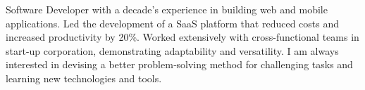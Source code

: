 
\begin{cvparagraph}

Software Developer with a decade's experience in building web and mobile applications. Led the development of a SaaS platform that reduced costs and increased productivity by 20\%. Worked extensively with cross-functional teams in start-up corporation, demonstrating adaptability and versatility. I am always interested in devising a better problem‑solving method for challenging tasks and learning new technologies and tools.
\end{cvparagraph}

